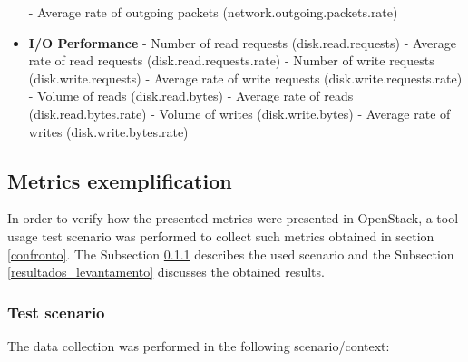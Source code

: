 \documentclass[conference]{IEEEtran}
\begin{document}
\begin{itemize}
    \subitem - Average rate of outgoing packets (network.outgoing.packets.rate)
  \item \textbf{I/O Performance} 
    \subitem - Number of read requests (disk.read.requests)
    \subitem - Average rate of read requests (disk.read.requests.rate)
    \subitem - Number of write requests (disk.write.requests)
    \subitem - Average rate of write requests (disk.write.requests.rate)
    \subitem - Volume of reads (disk.read.bytes)
    \subitem - Average rate of reads (disk.read.bytes.rate)
    \subitem - Volume of writes (disk.write.bytes)
    \subitem - Average rate of writes (disk.write.bytes.rate)
 \end{itemize}  

  \subsection{Metrics exemplification} 

      In order to verify how the presented metrics were presented in OpenStack, a tool usage test scenario was performed to collect
      such metrics obtained in section \ref{confronto}.
      The Subsection \ref{cenario} describes the used scenario and the Subsection \ref{resultados_levantamento} discusses the obtained results.
  
    \subsubsection{\textbf{Test scenario}} \label{cenario}
	
	The data collection was performed in the following scenario/context: 
	
\end{document}
